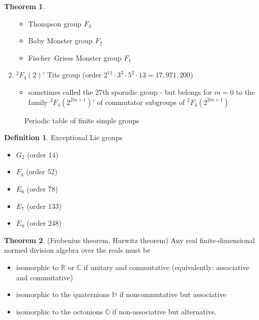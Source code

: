 \documentclass[10pt,a4paper]{article}
\theoremstyle{definition}
\newtheorem{definition}{Definition}[section]
\newtheorem{theorem}{Theorem}[section]
\begin{document}
\begin{theorem}
\begin{enumerate}
\begin{itemize}
        \item Thompson group $F_3$
        \item Baby Monster group $F_2$
        \item Fischer–Griess Monster group $F_1$
    \end{itemize}
    \item $^2F_4(2)'$ Tits group (order $2^11\cdot3^3\cdot5^2\cdot13=17,971,200$)
    \begin{itemize}
        \item sometimes called the 27th sporadic group - but belongs for $m=0$ to the family $^2F_4(2^{2m+1})'$ of commutator subgroups of $^2F_4(2^{2m+1})$
    \end{itemize}
\end{enumerate}
\end{theorem}

\begin{figure}[htp]
    \centering
    \caption{Periodic table of finite simple groups }
    \label{fig:galaxy}
\end{figure}

\begin{definition}{}
Exceptional Lie groups 
\begin{itemize}
    \item $G_2$ (order 14)
    \item $F_4$ (order 52)
    \item $E_6$ (order 78)
    \item $E_7$ (order 133)
    \item $E_8$ (order 248)
\end{itemize}
\end{definition}

\begin{theorem}
(Frobenius theorem, Hurwitz theorem) Any real finite-dimensional normed division algebra over the reals must be
\begin{itemize}
    \item isomorphic to $\mathbb{R}$ or $\mathbb{C}$ if unitary and commutative (equivalently: associative and commutative)
    \item isomorphic to the quaternions $\mathbb{H}$ if noncommutative but associative
    \item isomorphic to the octonions $\mathbb{O}$ if non-associative but alternative.
\end{itemize}
\end{theorem}
\end{document}
